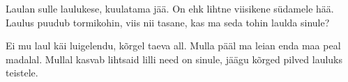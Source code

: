 Laulan sulle laulukese, kuulatama j\"a\"a.
On ehk lihtne viisikene s\"udamele h\"a\"a.
Laulus puudub tormikohin,
viis nii tasane,
kas ma seda tohin laulda sinule?

Ei mu laul k\"ai luigelendu, k\~orgel taeva all.
Mulla p\"a\"al ma leian enda maa peal madalal.
Mullal kasvab lihtsaid lilli
need on sinule,
j\"a\"agu k\~orged pilved lauluks teistele.